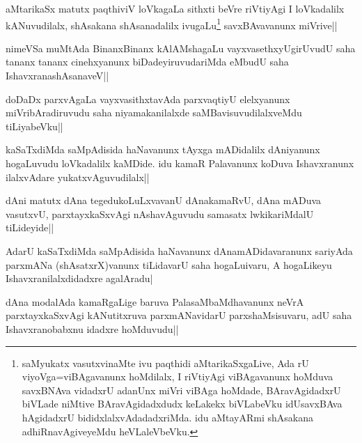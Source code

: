 \begin{artha}
aMtarikaSx matutx paqthiviV loVkagaLa sithxti beVre riVtiyAgi I loVkadalilx kANuvudilalx, shAsakana shAsanadalilx ivugaLu\footnote[2]{saMyukatx vasutxvinaMte ivu paqthidi aMtarikaSxgaLive, Ada rU viyoVga=viBAgavanunx hoMdilalx, I riVtiyAgi viBAgavanunx hoMduva savxBNAva vidadxrU adanUnx miVri viBAga hoMdade, BAravAgidadxrU biVLade niMtive BAravAgidadxdudx keLakekx biVLabeVku idUsavxBAva hAgidadxrU bididxlalxvAdadadxriMda. idu aMtayARmi shAsakana adhiRnavAgiveyeMdu heVLaleVbeVku.} savxBAvavanunx miVrive||
\end{artha}

\begin{artha}
nimeVSa muMtAda BinanxBinanx kAlAMshagaLu vayxvasethxyUgirUvudU saha tananx tananx cinehxyanunx biDadeyiruvudariMda eMbudU saha IshavxranashAsanaveV||
\end{artha}


\begin{artha}
doDaDx parxvAgaLa vayxvasithxtavAda parxvaqtiyU elelxyanunx miVribAradiruvudu saha niyamakanilalxde saMBavisuvudilalxveMdu tiLiyabeVku||
\end{artha}

\begin{artha}
kaSaTxdiMda saMpAdisida haNavanunx tAyxga mADidalilx dAniyanunx hogaLuvudu loVkadalilx kaMDide. idu kamaR Palavanunx koDuva Ishavxranunx ilalxvAdare yukatxvAguvudilalx||
\end{artha}


\begin{artha}
dAni matutx dAna tegedukoLuLxvavanU dAnakamaRvU, dAna mADuva vasutxvU, parxtayxkaSxvAgi nAshavAguvudu samasatx lwkikariMdalU tiLideyide||
\end{artha}

\begin{artha}%
AdarU kaSaTxdiMda saMpAdisida haNavanunx dAnamADidavaranunx sariyAda parxmANa (shAsatxrX)vanunx tiLidavarU saha hogaLuivaru, A hogaLikeyu Ishavxranilalxdidadxre agalAradu|
\end{artha}

\begin{artha}
dAna modalAda kamaRgaLige baruva PalasaMbaMdhavanunx neVrA parxtayxkaSxvAgi kANutitxruva parxmANavidarU parxshaMsisuvaru, adU saha Ishavxranobabxnu idadxre hoMduvudu||
\end{artha}

